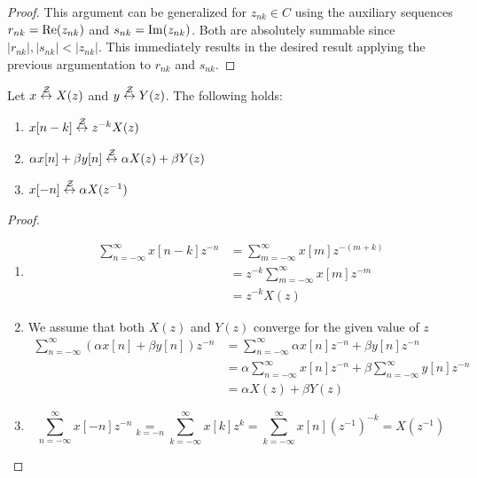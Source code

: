 \begin{proof}
    This argument can be generalized for $z_{nk} \in C$ using the auxiliary sequences $r_{nk} = \operatorname{Re}(z_{nk})$ and $s_{nk} = \operatorname{Im}(z_{nk})$. Both are absolutely summable since $|r_{nk}|, |s_{nk}| < |z_{nk}|$. This immediately results in the desired result applying the previous argumentation to $r_{nk}$ and $s_{nk}$.
\end{proof}

\begin{lemma}
    Let $x \overset{\mathcal{Z}}{\leftrightarrow} X(z)$ and $y \overset{\mathcal{Z}}{\leftrightarrow} Y(z)$. The following holds:
    \begin{enumerate}[label=\thelemma.\arabic*]
        \item \label{lm:z time shift} $x[n-k] \overset{\mathcal{Z}}{\leftrightarrow} z^{-k}X(z)$
        \item \label{lm:z linearity} $\alpha x[n] + \beta y[n] \overset{\mathcal{Z}}{\leftrightarrow} \alpha X(z) + \beta Y(z)$
        \item \label{lm:z reverse} $x[-n] \overset{\mathcal{Z}}{\leftrightarrow} \alpha X(z^{-1})$
    \end{enumerate}
\end{lemma}
\begin{proof} \hfill
    \begin{enumerate}
        \item
              \begin{align*}
                  \sum_{n=-\infty}^{\infty} x[n-k] z^{-n}
                   & = \sum_{m=-\infty}^{\infty} x[m] z^{-(m+k)}
                  \\ &= z^{-k} \sum_{m=-\infty}^{\infty} x[m] z^{-m}
                  \\ &= z^{-k} X(z)
              \end{align*}
        \item We assume that both $X(z)$ and $Y(z)$ converge for the given value of $z$
              \begin{align*}
                  \sum_{n=-\infty}^{\infty} (\alpha x[n] + \beta y[n])z^{-n}
                   & = \sum_{n=-\infty}^{\infty} \alpha x[n] z^{-n} + \beta y[n] z^{-n}
                  \\ &= \alpha \sum_{n=-\infty}^{\infty} x[n] z^{-n} + \beta \sum_{n=-\infty}^{\infty} y[n] z^{-n}
                  \\ &= \alpha X(z) + \beta Y(z)
              \end{align*}
        \item
              \[\sum_{n=-\infty}^{\infty} x[-n] z^{-n}
                  \underset{k = -n}{=} \sum_{k=-\infty}^{\infty} x[k] z^{k}
                  = \sum_{k=-\infty}^{\infty} x[n] {\left(z^{-1}\right)}^{-k}
                  = X(z^{-1})\]
    \end{enumerate}
\end{proof}

